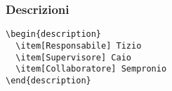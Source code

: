 \begin{frame}[fragile]\transfade\centering
  \frametitle{Descrizioni}
  \verb!\begin{description}              !\\
  \verb!  \item[Responsabile] Tizio      !\\
  \verb!  \item[Supervisore] Caio        !\\
  \verb!  \item[Collaboratore] Sempronio!\\
  \verb!\end{description}                !\\~
\end{frame}

